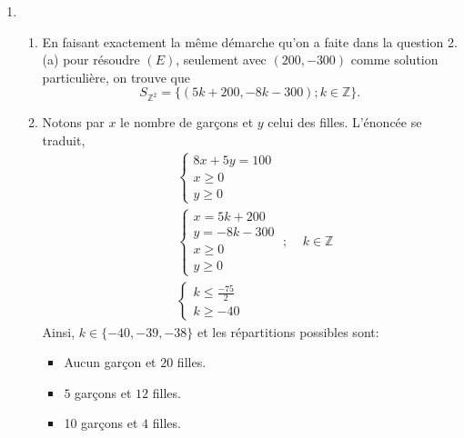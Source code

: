 \documentclass[a4paper]{article}
\begin{document}
\begin{enumerate}
\item \begin{enumerate}
	\item En faisant exactement la même démarche qu'on a faite dans la question 2.(a) pour résoudre $(E)$, seulement avec $(200,-300)$ comme solution particulière, on trouve que  \[
			S_{\mathbb{Z}^2}=\Big\{(5k+200,-8k-300);k\in\mathbb{Z}\Big\}
	.\] 
\item Notons par $x$ le nombre de garçons et $y$ celui des filles. L'énoncée se traduit, 
	\begin{align*}
		&\begin{cases}
			8x+5y=100\\
			x\geq 0\\
			y\geq 0
		\end{cases}\\
		&\begin{cases}
			x=5k+200\\
			y=-8k-300\\
			x\geq 0\\
			y\geq 0
		\end{cases} \; ; \; \; \; \;k\in\mathbb{Z}\\
		&\begin{cases}
			k\leq\frac{-75}{2}\\
			k\geq-40
		\end{cases}
	\end{align*}
	Ainsi, $k\in\{-40,-39,-38\}$ et les répartitions possibles sont:
	\begin{itemize}
		\item Aucun garçon et $20$ filles.
		\item $5$ garçons et $12$ filles.
		\item 10 garçons et $4$ filles.
	\end{itemize}
	\end{enumerate}
\end{enumerate}
\end{document}
